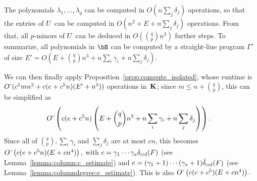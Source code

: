 \documentclass[12pt]{article}
\begin{document}
The polynomials $\lambda_1,\dots,\lambda_q$ can be computed in $O(n \sum_j
\delta_j)$ operations, so that the entries of ${U}$ can be computed in
$O(n^2 + E + n \sum_j \delta_j)$ operations. From that, all $p$-minors
of ${U}$ can be deduced in $O({q \choose p} n^3)$ further steps.
To summarize, all polynomials in $\bB$ can be computed by a straight-line
program $\Gamma'$ of size
$E'=O(E + {q \choose p} n^3 +n \sum_i \gamma_i + n \sum_j \delta_j)$.

\medskip

We can then finally apply Proposition~\ref{prop:compute_isolated},
whose runtime is ${O}{\,\tilde{ }\,}(c^5 m n^2 + c(e+c^5 n)(E' + n^3))$ operations
in~$\mathbf{K}$; since $m \le n + {q \choose p}$, this can be simplified as
$${O}{\,\tilde{ }\,}\left (c(e+c^5 n)\left(E + {q \choose p} n^3 +n \sum_i
    \gamma_i + n \sum_j \delta_j\right)\right).$$
Since all of $ {q \choose p}, \sum_i \gamma_i$ and $\sum_j \delta_j$
are at most $cn$, this becomes
${O}{\,\tilde{ }\,}\left (c(e+c^5 n)(E + cn^4)\right),$ with
$c=\gamma_1\cdots\gamma_s \delta_{\rm col}({F})$ (see
Lemma~\ref{lemma:column:c_estimate}) and
$e=(\gamma_1+1)\cdots(\gamma_s+1) \tilde\delta_{\rm col}({F})$ (see
Lemma~\ref{lemma:columndegree:e_estimate}).  This is also
${O}{\,\tilde{ }\,}\left (c(e+c^5 )(E + cn^4)\right).$
\end{document}
